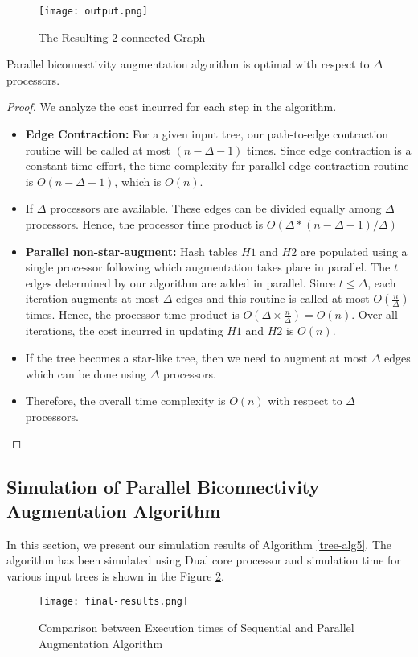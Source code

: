 \documentclass[runningheads]{llncs}
\begin{document}
\begin{figure}[htpb]
\begin{center}
\texttt{[image: output.png]}
\caption {The Resulting 2-connected Graph}   \label{fig:out}
\end{center}
\end{figure}
\begin{lemma}
Parallel biconnectivity augmentation algorithm is optimal with respect to $\Delta$ processors. 
\end{lemma}
\begin{proof}
We analyze the cost incurred for each step in the algorithm.  
\begin{itemize}
\item {\bf Edge Contraction:} For a given input tree, our path-to-edge contraction routine will be called at most $(n-\Delta -1)$ times.  Since edge contraction is a constant time effort, the time complexity for parallel edge contraction routine is $O(n-\Delta-1)$, which is $O(n)$.
\item If $\Delta$ processors are available.  These edges can be divided equally among $\Delta$ processors. Hence, the processor time product is $O(\Delta * (n-\Delta-1)/\Delta)$
\item {\bf Parallel non-star-augment:} Hash tables $H1$ and $H2$ are populated using a single processor following which augmentation takes place in parallel. The $t$ edges determined by our algorithm are added in parallel.  Since $t \leq \Delta$, each iteration augments at most $\Delta$ edges and this routine is called at most $O(\frac{n}{\Delta})$ times.  Hence, the processor-time product is $O(\Delta \times \frac{n}{\Delta})= O(n)$.  Over all iterations, the cost incurred in updating $H1$ and $H2$ is $O(n)$.
\item If the tree becomes a star-like tree, then we need to augment at most $\Delta$ edges which can be done using $\Delta$ processors.
\item Therefore, the overall time complexity is $O(n)$ with respect to $\Delta$ processors.
\end{itemize}
\end{proof}
\subsection{Simulation of Parallel Biconnectivity Augmentation Algorithm}
In this section, we present our simulation results of Algorithm \ref{tree-alg5}.  The algorithm has been simulated using Dual core processor and simulation time for various input trees is shown in the Figure \ref{simulation}.
\begin{figure}[htpb]
\begin{center}
\texttt{[image: final-results.png]}
\caption{Comparison between Execution times of Sequential and Parallel Augmentation Algorithm} \label{simulation}
\end{center}
\end{figure}
\end{document}
